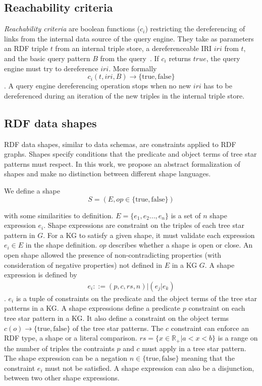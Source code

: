 \subsection{Reachability criteria}

\emph{Reachability criteria} are boolean functions ($c_i$) restricting the dereferencing of links from the internal data source of the query engine.
They take as parameters an RDF triple $t$ from an internal triple store, a dereferenceable IRI $iri$ from $t$, and the basic query pattern $B$ from the query~\cite{Hartig2012}.
If $c_i$ returns $true$, the query engine must try to dereference $iri$.
More formally
\begin{equation}\label{eq:reachabilityCriteria}
c_i(t, iri, B) \rightarrow \{\mathrm{true}, \mathrm{false}\}
\end{equation}
.
A query engine dereferencing operation stops when no new $iri$ has to be dereferenced during an iteration of the new triples in the internal triple store.

\subsection{RDF data shapes}
RDF data shapes, similar to data schemas, are constraints applied to RDF graphs.
Shapes specify conditions that the predicate and object terms of tree star patterns must respect.
In this work, we propose an abstract formalization of shapes and make no distinction between different shape languages.~

We define a shape
\begin{equation}
S = (E, op \in \{\mathrm{true},\mathrm{false}\})
\end{equation}

with some similarities to \citeauthor{Abbas2018} definition.
$E = \{e_1, e_2 ..., e_{n}\}$ is a set of $n$ shape expression $e_i$.
Shape expressions are constraint on the triples of each tree star pattern in $G$.
For a KG to satisfy a given shape, it must validate each expression $e_i \in E$ in the shape definition.
$op$ describes whether a shape is open or close.
An open shape allowed the presence of non-contradicting properties (with consideration of negative properties) not defined in $E$ in a KG $G$.
A shape expression is defined by
\begin{align}
 e_i ::= (p, c, rs, n) | (e_j|e_k)
\end{align}
.
$e_i$ is a tuple of constraints on the predicate and the object terms of the tree star patterns in a KG. 
A shape expressions define a predicate $p$ constraint on each tree star pattern in a KG.
It also define a constraint on the object terms $c(o) \rightarrow \{\mathrm{true}, \mathrm{false}\}$ of the tree star patterns.
The $c$ constraint can enforce an RDF type, a shape or a literal comparison.
$rs = \{x \in \mathbb{R}_+ | a < x < b \}$ is a range on the number of triples the contraints $p$ and $c$ must apply in a tree star pattern.
The shape expression can be a negation $n \in \{\mathrm{true}, \mathrm{false}\}$ meaning that the constraint $e_i$ must not be satisfied.
A shape expression can also be a disjunction, between two other shape expressions.

